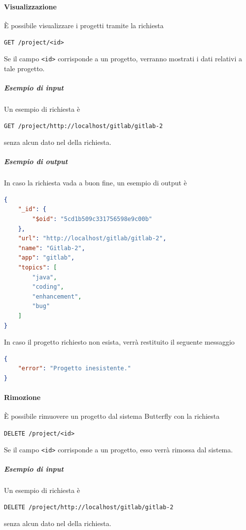 \paragraph{Visualizzazione}
È possibile visualizzare i progetti tramite la richiesta
    \begin{center}
        \texttt{GET /project/<id>}
    \end{center}
Se il campo \texttt{<id>} corrisponde a un progetto, verranno mostrati i dati relativi a tale progetto.

    \subparagraph{Esempio di input}
    Un esempio di richiesta è
        \begin{center}
            \texttt{GET /project/http://localhost/gitlab/gitlab-2}
        \end{center}
    senza alcun dato nel  della richiesta.

    \subparagraph{Esempio di output}
    In caso la richiesta vada a buon fine, un esempio di output è
    \begin{lstlisting}[language = json]
{
    "_id": {
        "$oid": "5cd1b509c331756598e9c00b"
    },
    "url": "http://localhost/gitlab/gitlab-2",
    "name": "Gitlab-2",
    "app": "gitlab",
    "topics": [
        "java",
        "coding",
        "enhancement",
        "bug"
    ]
}
	\end{lstlisting}

	In caso il progetto richiesto non esista, verrà restituito il seguente messaggio
    \begin{lstlisting}[language = json]
{
    "error": "Progetto inesistente."
}
	\end{lstlisting}


\paragraph{Rimozione}

È possibile rimuovere un progetto dal sistema Butterfly con la richiesta
\begin{center}
    \texttt{DELETE /project/<id>}
\end{center}

Se il campo \texttt{<id>} corrisponde a un progetto, esso verrà rimossa dal sistema.

    \subparagraph{Esempio di input}
    Un esempio di richiesta è
    \begin{center}
	    \texttt{DELETE /project/http://localhost/gitlab/gitlab-2}
    \end{center}
    senza alcun dato nel  della richiesta.

